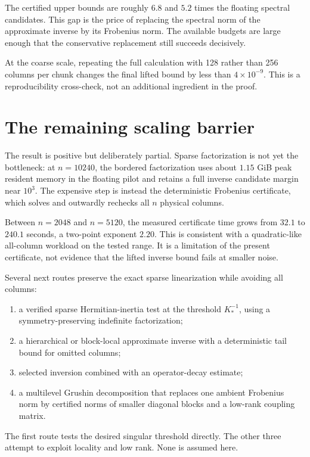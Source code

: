 \documentclass[11pt]{article}
\theoremstyle{definition}
\theoremstyle{remark}
\begin{document}
The certified upper bounds are roughly $6.8$ and $5.2$ times the floating
spectral candidates.  This gap is the price of replacing the spectral norm
of the approximate inverse by its Frobenius norm.  The available budgets are
large enough that the conservative replacement still succeeds decisively.

At the coarse scale, repeating the full calculation with 128 rather than 256
columns per chunk changes the final lifted bound by less than
$4\times10^{-9}$.  This is a reproducibility cross-check, not an additional
ingredient in the proof.


\section{The remaining scaling barrier}
\label{sec:scaling-barrier}

The result is positive but deliberately partial.  Sparse factorization is
not yet the bottleneck: at $n=10240$, the bordered factorization uses about
$1.15$ GiB peak resident memory in the floating pilot and retains a full
inverse candidate margin near $10^3$.  The expensive step is instead the
deterministic Frobenius certificate, which solves and outwardly rechecks all
$n$ physical columns.

Between $n=2048$ and $n=5120$, the measured certificate time grows from
$32.1$ to $240.1$ seconds, a two-point exponent $2.20$.  This is consistent
with a quadratic-like all-column workload on the tested range.  It is a
limitation of the present certificate, not evidence that the lifted inverse
bound fails at smaller noise.

Several next routes preserve the exact sparse linearization while avoiding
all columns:
\begin{enumerate}
 \item a verified sparse Hermitian-inertia test at the threshold
       $K_*^{-1}$, using a symmetry-preserving indefinite factorization;
 \item a hierarchical or block-local approximate inverse with a deterministic
       tail bound for omitted columns;
 \item selected inversion combined with an operator-decay estimate;
 \item a multilevel Grushin decomposition that replaces one ambient
       Frobenius norm by certified norms of smaller diagonal blocks and a
       low-rank coupling matrix.
\end{enumerate}
The first route tests the desired singular threshold directly.  The other
three attempt to exploit locality and low rank.  None is assumed here.
\end{document}
